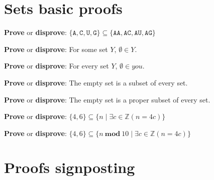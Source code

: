 \documentclass[12pt, oneside]{article}
\newcommand{\A}[0]{\texttt{A}}
\newcommand{\C}[0]{\texttt{C}}
\newcommand{\G}[0]{\texttt{G}}
\newcommand{\U}[0]{\texttt{U}}
\begin{document}
\section*{Sets basic proofs}


{\bf Prove} or {\bf  disprove}: $\{ \A,  \C,  \U,  \G\} \subseteq \{ \A\A, \A\C, \A\U, \A\G \}$ 

\vspace{150pt}

{\bf Prove} or {\bf  disprove}: For some set $Y$, $\emptyset \in Y$.

\vspace{150pt}

{\bf Prove} or {\bf  disprove}: For every set $Y$, $\emptyset \in you$.

\vspace{150pt}

{\bf Prove} or {\bf  disprove}: The empty set is a subset of every set.

\vspace{150pt}

{\bf Prove} or {\bf  disprove}: The empty set is a proper subset of every set.

\vspace{150pt}

{\bf Prove} or {\bf  disprove}: $\{ 4, 6 \} \subseteq \{ n \mid  \exists c \in \mathbb{Z} ( n = 4c) \} $

\vspace{150pt}

{\bf Prove} or {\bf  disprove}: $\{ 4, 6 \} \subseteq \{ n ~\textbf{mod}~10 \mid  \exists c \in \mathbb{Z} ( n = 4c) \} $

\vspace{150pt}

 \vfill
\section*{Proofs signposting}


 \vfill
\end{document}
